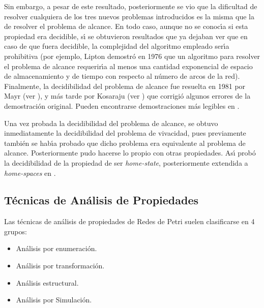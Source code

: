 Sin embargo, a pesar de este resultado, posteriormente se vio que la
dificultad de resolver cualquiera de los tres nuevos
problemas introducidos es la misma que la de resolver el
problema de alcance. En todo caso, aunque no se conoc\'{\i}a si esta
propiedad era decidible, s\'{\i} se obtuvieron
resultados que ya dejaban ver que en caso de que fuera decidible,
la complejidad del algoritmo empleado ser\'{\i}a prohibitiva
(por ejemplo, Lipton \cite{Lip76}
demostr\'{o} en 1976 que un algoritmo para resolver el problema de
alcance requerir\'{\i}a al menos una cantidad exponencial de espacio
de almacenamiento y de tiempo con respecto al n\'{u}mero de arcos de la red).
Finalmente, la decidibilidad del pro\-ble\-ma de
alcance fue resuelta en 1981 por
Mayr (ver \cite{May81}), y m\'{a}s tarde por Kosaraju (ver
\cite{Kos82}) que corrigi\'{o} algunos errores de la
demostraci\'{o}n original. Pueden encontrarse demostraciones m\'{a}s
legibles en \cite{Lam86,Reu90,Lam92}.

Una vez probada la decidibilidad del problema de
alcance, se obtuvo inme\-dia\-ta\-men\-te la decidibilidad del
problema de vivacidad, pues previamente \cite{Pet81} tambi\'{e}n se
hab\'{\i}a probado que dicho problema era equivalente al problema de alcance.
Posteriormente pudo hacerse lo propio con otras propiedades. As\'{\i}
\cite{Fru86} prob\'{o} la decidibilidad de la propiedad de ser {\it
home-state}, posteriormente extendida a {\it home-spaces} en
\cite{JoFr91}.

\subsection{T\'{e}cnicas de An\'{a}lisis de Propiedades}

Las t\'{e}cnicas de an\'{a}lisis de propiedades de Redes de Petri suelen
clasificarse en 4 grupos:
\begin{itemize}
\item An\'{a}lisis por enumeraci\'{o}n.
\item An\'{a}lisis por transformaci\'{o}n.
\item An\'{a}lisis estructural.
\item An\'{a}lisis por Simulaci\'{o}n.
\end{itemize}

